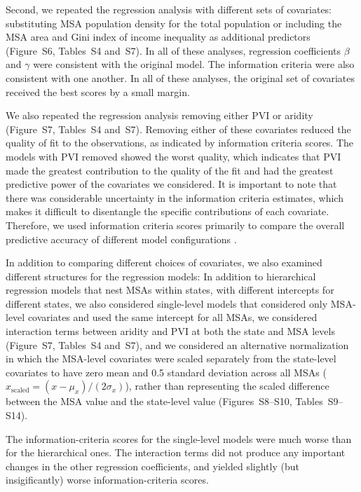 \documentclass[draft,linenumbers]{agujournal}\usepackage{knitr}
\begin{document}
Second, we repeated the regression analysis
with different sets of covariates:
substituting MSA population density
for the total population or
including the MSA area and Gini index of income inequality as additional
predictors (Figure~S6, Tables~S4 and~S7).
In all of these analyses, regression coefficients $\beta$ and $\gamma$
were consistent with the original model.
The information criteria were also consistent with one another.
In all of these analyses, the original set of covariates received the best
scores by a small
margin.

We also repeated the regression analysis removing either PVI or aridity
(Figure~S7, Tables~S4 and~S7).
Removing either of these covariates
reduced the quality of fit to the observations,
as indicated by information criteria scores.
The models with PVI removed showed the worst quality, which indicates that PVI
made the greatest contribution to the quality of the fit and had the greatest predictive power
of the covariates we considered.
It is important to note that there was considerable uncertainty in the information criteria estimates, which makes it
difficult to disentangle the specific contributions of each covariate.
Therefore, we used information criteria scores primarily to compare the overall predictive accuracy of different
model configurations \citep{gelman:predictive:2014}.

In addition to comparing different choices of covariates, we also
examined different structures for the regression models:
In addition to hierarchical regression models that nest MSAs within states,
with different intercepts for different states, we also
considered single-level models that considered only MSA-level covariates and
used the same intercept for all MSAs,
we considered interaction terms between aridity and PVI at both
the state and MSA levels (Figure~S7, Tables~S4 and~S7),
and we considered an alternative normalization
in which the MSA-level covariates were scaled separately
from the state-level covariates to have zero mean and 0.5 standard deviation
across all MSAs ($x_{\text{scaled}} = (x - \mu_x) / (2 \sigma_x)$),
rather than representing
the scaled difference between the MSA value and the state-level value
(Figures~S8--S10, Tables~S9--S14).

The information-criteria scores for the single-level models were much
worse than for the hierarchical ones.
The interaction terms did not produce any
important changes in the other regression coefficients, and yielded
slightly (but insigificantly) worse information-criteria scores.
\end{document}
